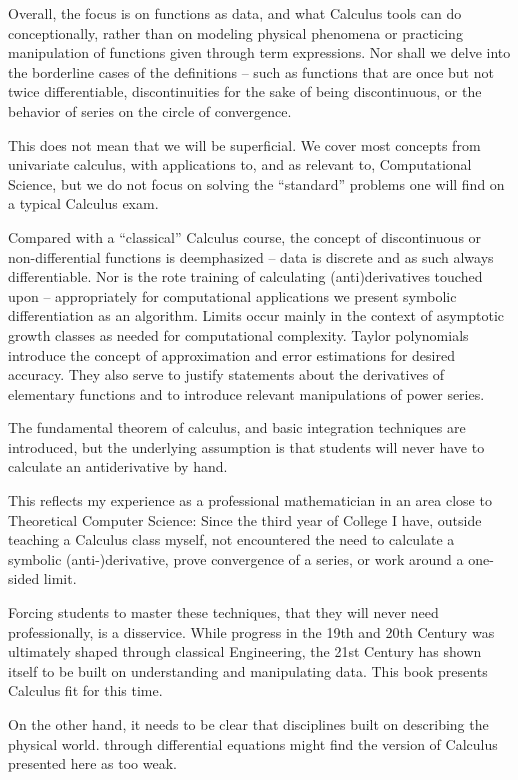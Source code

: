Overall, the focus is on functions as data, and what Calculus tools can do
conceptionally, rather than on modeling physical phenomena or practicing
manipulation of functions given through term expressions. Nor shall we delve
into the borderline cases of the definitions -- such as functions that are
once but not twice differentiable, discontinuities for the sake of being
discontinuous, or the behavior of series on the circle of convergence.

This does not mean that we will be superficial. We cover most concepts
from univariate calculus, with applications to, and as relevant to,
Computational Science, but we do not focus on solving the ``standard''
problems one will find on a typical Calculus exam.
\medskip

Compared with a ``classical'' Calculus course, the concept of discontinuous
or non-differential functions is deemphasized -- data is discrete and as
such always differentiable. Nor is the rote training of calculating
(anti)derivatives touched upon -- appropriately for computational
applications we present symbolic differentiation as an algorithm.  Limits
occur mainly in the context of asymptotic growth classes as needed for
computational complexity.  Taylor polynomials introduce the concept of
approximation and error estimations for desired accuracy. They also serve to
justify statements about the derivatives of elementary functions and to
introduce relevant manipulations of power series.

The fundamental theorem of calculus, and basic integration techniques are
introduced, but the underlying assumption is that students will never
have to calculate an antiderivative by hand.
\medskip

This reflects my experience as a professional mathematician in an
area
close to Theoretical Computer Science: Since the third year of College I
have, outside teaching a Calculus class myself, not
encountered the need to calculate a symbolic (anti-)derivative, prove
convergence of a series, or work around a one-sided limit.
\smallskip

Forcing students to master these techniques, that they will never need
professionally, is a disservice. While progress in the 19th and 20th Century 
was ultimately shaped through classical Engineering,  the 21st Century has
shown itself to be built on understanding and manipulating data. This book
presents Calculus fit for this time.

On the other hand, it
needs to be clear that disciplines built on describing the physical world.
through differential equations might find the version of Calculus presented
here as too weak. 
\medskip

